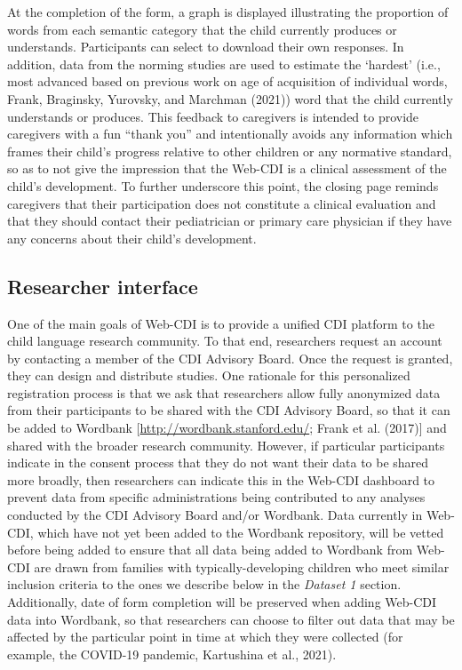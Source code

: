 \documentclass[
  english,
  ,man,floatsintext]{apa6}
\begin{document}
At the completion of the form, a graph is displayed illustrating the proportion of words from each semantic category that the child currently produces or understands. Participants can select to download their own responses. In addition, data from the norming studies are used to estimate the `hardest' (i.e., most advanced based on previous work on age of acquisition of individual words, Frank, Braginsky, Yurovsky, and Marchman (2021)) word that the child currently understands or produces. This feedback to caregivers is intended to provide caregivers with a fun ``thank you'' and intentionally avoids any information which frames their child's progress relative to other children or any normative standard, so as to not give the impression that the Web-CDI is a clinical assessment of the child's development. To further underscore this point, the closing page reminds caregivers that their participation does not constitute a clinical evaluation and that they should contact their pediatrician or primary care physician if they have any concerns about their child's development.

\hypertarget{researcher-interface}{%
\subsection{Researcher interface}\label{researcher-interface}}

One of the main goals of Web-CDI is to provide a unified CDI platform to the child language research community. To that end, researchers request an account by contacting a member of the CDI Advisory Board. Once the request is granted, they can design and distribute studies. One rationale for this personalized registration process is that we ask that researchers allow fully anonymized data from their participants to be shared with the CDI Advisory Board, so that it can be added to Wordbank {[}\url{http://wordbank.stanford.edu/}; Frank et al. (2017){]} and shared with the broader research community. However, if particular participants indicate in the consent process that they do not want their data to be shared more broadly, then researchers can indicate this in the Web-CDI dashboard to prevent data from specific administrations being contributed to any analyses conducted by the CDI Advisory Board and/or Wordbank. Data currently in Web-CDI, which have not yet been added to the Wordbank repository, will be vetted before being added to ensure that all data being added to Wordbank from Web-CDI are drawn from families with typically-developing children who meet similar inclusion criteria to the ones we describe below in the \emph{Dataset 1} section. Additionally, date of form completion will be preserved when adding Web-CDI data into Wordbank, so that researchers can choose to filter out data that may be affected by the particular point in time at which they were collected (for example, the COVID-19 pandemic, Kartushina et al., 2021).
\end{document}

